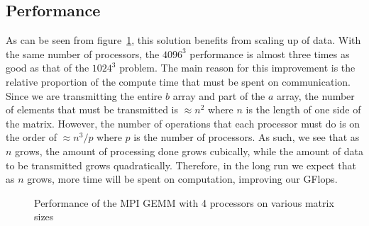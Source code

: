 \documentclass[letterpaper,twocolumn,10pt]{article}
\begin{document}
\subsection{Performance}
As can be seen from figure~\ref{fig:size}, this solution benefits from scaling
up of data. With the same number of processors, the $4096^3$ performance is
almost three times as good as that of the $1024^3$ problem. The main reason for
this improvement is the relative proportion of the compute time that must be
spent on communication. Since we are transmitting the entire $b$ array and part
of the $a$ array, the number of elements that must be transmitted is 
$\approx n^2$ where $n$ is the length of one side of the matrix. However, the
number of operations that each processor must do is on the order of 
$\approx n^3/p$ where $p$ is the number of processors. As such, we see that as
$n$ grows, the amount of processing done grows cubically, while the amount of
data to be transmitted grows quadratically. Therefore, in the long run we
expect that as $n$ grows, more time will be spent on computation, improving our
GFlops.
\begin{figure}
    \caption{\label{fig:size} Performance of the MPI GEMM with 4 processors
    on various matrix sizes}
\end{figure}
\end{document}
